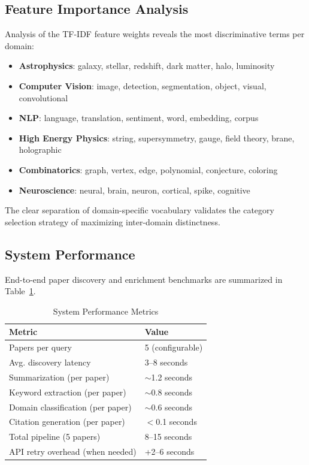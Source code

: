 \documentclass[conference]{IEEEtran}
\begin{document}
\subsection{Feature Importance Analysis}

Analysis of the TF-IDF feature weights reveals the most discriminative terms per domain:

\begin{itemize}
    \item \textbf{Astrophysics}: galaxy, stellar, redshift, dark matter, halo, luminosity
    \item \textbf{Computer Vision}: image, detection, segmentation, object, visual, convolutional
    \item \textbf{NLP}: language, translation, sentiment, word, embedding, corpus
    \item \textbf{High Energy Physics}: string, supersymmetry, gauge, field theory, brane, holographic
    \item \textbf{Combinatorics}: graph, vertex, edge, polynomial, conjecture, coloring
    \item \textbf{Neuroscience}: neural, brain, neuron, cortical, spike, cognitive
\end{itemize}

The clear separation of domain-specific vocabulary validates the category selection strategy of maximizing inter-domain distinctness.

\subsection{System Performance}

End-to-end paper discovery and enrichment benchmarks are summarized in Table~\ref{tab:sysperf}.

\begin{table}[htbp]
\caption{System Performance Metrics}
\label{tab:sysperf}
\centering
\begin{tabular}{@{}ll@{}}
\toprule
\textbf{Metric} & \textbf{Value} \\
\midrule
Papers per query & 5 (configurable) \\
Avg. discovery latency & 3--8 seconds \\
Summarization (per paper) & $\sim$1.2 seconds \\
Keyword extraction (per paper) & $\sim$0.8 seconds \\
Domain classification (per paper) & $\sim$0.6 seconds \\
Citation generation (per paper) & $<$0.1 seconds \\
Total pipeline (5 papers) & 8--15 seconds \\
API retry overhead (when needed) & +2--6 seconds \\
\bottomrule
\end{tabular}
\end{table}
\end{document}
